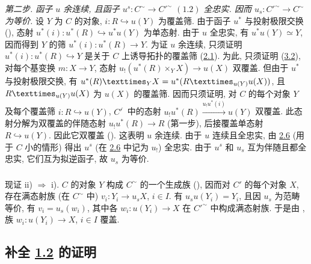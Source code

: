 \noindent \emph{第二步. 函子 $u$ 余连续, 且函子 $u^s:C^{\sim}\rightarrow {C'}^{\sim}$
$(\hyperref[III.prop1.2]{1.2})$ 全忠实. 因而 $u_s:{C'}^{\sim}\rightarrow C^{\sim}$ 为等价.}
设 $Y$ 为 $C$ 的对象, $i:R\hookrightarrow u(Y)$ 为覆盖筛.
由于函子 $u^{\ast}$ 与投射极限交换 (),
态射 $u^{\ast}(i):u^{\ast}(R)\hookrightarrow u^{\ast}u(Y)$ 为单态射.
由于 $u$ 全忠实, 有 $u^{\ast}u(Y)\simeq Y$, 因而得到 $Y$ 的筛
$u^{\ast}(i):u^{\ast}(R)\rightarrow Y$.
为证 $u$ 余连续, 只须证明 $u^{\ast}(i):u^{\ast}(R)\hookrightarrow Y$
是关于 $C$ 上诱导拓扑的覆盖筛 (\hyperref[III.def2.1]{2.1}).
为此, 只须证明 (\hyperref[III.prop3.2]{3.2}), 对每个基变换 $m:X\rightarrow Y$,
态射 $u_{!}(u^{\ast}(R)\times_Y X)\rightarrow u(X)$ 双覆盖.
但由于 $u^{\ast}$ 与\pageoriginale{}投射极限交换, 有
$\fprod{u^{\ast}(R)}{X}{Y}=u^{\ast}(\fprod{R}{u(X)}{u(Y)})$,
且 $\fprod{R}{u(X)}{u(Y)}$ 为 $u(X)$ 的覆盖筛.
因而只须证明, 对 $C$ 的每个对象 $Y$ 及每个覆盖筛 $i:R\hookrightarrow u(Y)$,
${C'}^{\widehat{\phantom{,}}}$ 中的态射
$u_{!}u^{\ast}(R)\xrightarrow{u_{!}u^{\ast}(i)}u(Y)$ 双覆盖.
此态射分解为双覆盖的伴随态射 $u_{!}u^{\ast}(R)\rightarrow R$ (第一步),
后接覆盖单态射 $R\hookrightarrow u(Y)$.
因此它双覆盖 (). 这表明 $u$ 余连续.
由于 $u$ 连续且全忠实, 由 \hyperref[III.prop2.6]{2.6}
(用于 $C$ 小的情形) 得出 $u^s$ (在 \hyperref[III.prop2.6]{2.6} 中记为 $u_{!}$) 全忠实.
由于 $u^s$ 和 $u_s$ 互为伴随且都全忠实, 它们互为拟逆函子, 故 $u_s$ 为等价.

\setcounter{subsection}{1}
\subsubsection{}
现证 ii) $\Rightarrow$ i). $C$ 的对象 $Y$ 构成 $C^{\sim}$ 的一个生成族
(),
因而对 $C'$ 的每个对象 $X$, 存在满态射族 (在 $C^{\sim}$ 中)
$v_i:Y_i\rightarrow u_s X$, $i\in I$.
有 $u_su(Y_i)=Y_i$, 且因 $u_s$ 为范畴等价, 有 $v_i=u_s(w_i)$,
其中各 $w_i:u(Y_i)\rightarrow X$ 在 ${C'}^{\sim}$ 中构成满态射族.
于是由 , 族
$w_i:u(Y_i)\rightarrow X$, $i\in I$ 覆盖.

\subsection{补全 \hyperref[III.prop1.2]{1.2} 的证明}

